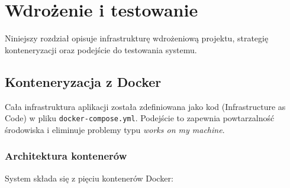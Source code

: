 ﻿\documentclass[a4paper,twoside,11pt]{mwrep}
\theoremstyle{plain} \newtheorem{thm}{Twierdzenie}
\theoremstyle{plain} \newtheorem{lem}{Lemat}
\theoremstyle{definition} \newtheorem{defn}{Definicja}
\theoremstyle{remark} \newtheorem*{rem}{Wniosek}
\begin{document}
\chapter{Wdrożenie i testowanie}
\label{chap:wdrozenie}

Niniejszy rozdział opisuje infrastrukturę wdrożeniową projektu, strategię konteneryzacji oraz podejście do testowania systemu.

\section{Konteneryzacja z Docker}

Cała infrastruktura aplikacji została zdefiniowana jako kod (Infrastructure as Code) w pliku \texttt{docker-compose.yml}. Podejście to zapewnia powtarzalność środowiska i eliminuje problemy typu \textit{works on my machine}.

\subsection{Architektura kontenerów}

System składa się z pięciu kontenerów Docker:
\end{document}
